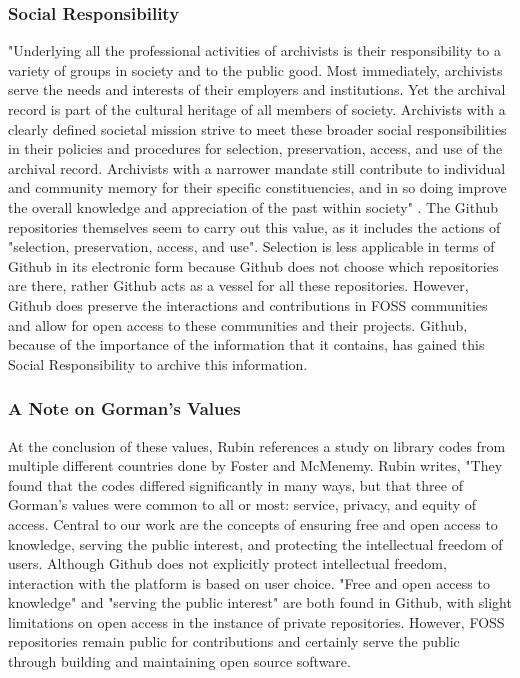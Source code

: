 \subsubsection{Social Responsibility}

"Underlying all the professional activities of archivists is their responsibility to a variety of groups in society and to the public good. Most immediately, archivists serve the needs and interests of their employers and institutions. Yet the archival record is part of the cultural heritage of all members of society. Archivists with a clearly defined societal mission strive to meet these broader social responsibilities in their policies and procedures for selection, preservation, access, and use of the archival record. Archivists with a narrower mandate still contribute to individual and community memory for their specific constituencies, and in so doing improve the overall knowledge and appreciation of the past within society" \cite{rubin2016foundationslis}. The Github repositories themselves seem to carry out this value, as it includes the actions of "selection, preservation, access, and use". Selection is less applicable in terms of Github in its electronic form because Github does not choose which repositories are there, rather Github acts as a vessel for all these repositories. However, Github does preserve the interactions and contributions in FOSS communities and allow for open access to these communities and their projects. Github, because of the importance of the information that it contains, has gained this Social Responsibility to archive this information. 



\subsubsection{A Note on Gorman's Values}

At the conclusion of these values, Rubin references a study on library codes from multiple different countries done by Foster and McMenemy. Rubin writes, "They found that the codes differed significantly in many ways, but that three of Gorman’s values were common to all or most: service, privacy, and equity of access. Central to our work are the concepts of ensuring free and open access to knowledge, serving the public interest, and protecting the intellectual freedom of users\cite{rubin2016foundationslis}. Although Github does not explicitly protect intellectual freedom, interaction with the platform is based on user choice. "Free and open access to knowledge" and "serving the public interest" are both found in Github, with slight limitations on open access in the instance of private repositories. However, FOSS repositories remain public for contributions and certainly serve the public through building and maintaining open source software.

